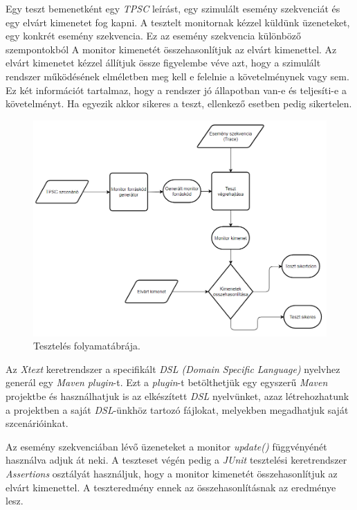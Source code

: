 Egy teszt bemenetként egy \textit{TPSC} leírást, egy szimulált esemény szekvenciát és egy elvárt kimenetet fog kapni.
A tesztelt monitornak kézzel küldünk üzeneteket, egy konkrét esemény szekvencia.
Ez az esemény szekvencia különböző szempontokból
A monitor kimenetét összehasonlítjuk az elvárt kimenettel.
Az elvárt kimenetet kézzel állítjuk össze figyelembe véve azt, hogy a szimulált rendszer működésének elméletben meg kell e felelnie a követelménynek vagy sem.
Ez két információt tartalmaz, hogy a rendszer jó állapotban van-e és teljesíti-e a követelményt.
Ha egyezik akkor sikeres a teszt, ellenkező esetben pedig sikertelen.

\begin{figure}[!ht]
    \centering
    \includegraphics[width=160mm, keepaspectratio]{figures/test_flowchart.png}
    \caption{Tesztelés folyamatábrája.}
    \label{testing_figure}
\end{figure}

Az \textit{Xtext} keretrendszer a specifikált \textit{DSL (Domain Specific Language)} nyelvhez generál egy \textit{Maven} \textit{plugin}-t.
Ezt a \textit{plugin}-t betölthetjük egy egyszerű \textit{Maven} projektbe és használhatjuk is az elkészített \textit{DSL} nyelvünket, azaz létrehozhatunk a projektben a saját \textit{DSL}-ünkhöz tartozó fájlokat, melyekben megadhatjuk saját szcenárióinkat.

Az esemény szekvenciában lévő üzeneteket a monitor \textit{update()} függvényénét használva adjuk át neki.
A teszteset végén pedig a \textit{JUnit} tesztelési keretrendszer \textit{Assertions} osztályát használjuk, hogy a monitor kimenetét összehasonlítjuk az elvárt kimenettel.
A teszteredmény ennek az összehasonlításnak az eredménye lesz.

